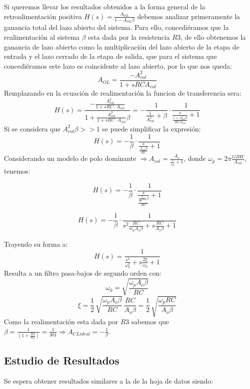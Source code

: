Si queremos llevar los resultados obtenidos a la forma general de la retroalimentación positiva $H(s) = \frac{A_{OL}}{1-A_{OL}\beta}$ debemos analizar primeramente la ganancia total del lazo abierto del sistema. Para ello, concediéramos que la realimentación al sistema $\beta$ esta dada por la resistencia $R3$, de ello obtenemos la ganancia de lazo abierto como la multiplicación del lazo abierto de la etapa de entrada y el lazo cerrado de la etapa de salida, que para el sistema que concediéramos este lazo es coincidente al lazo abierto, por lo que nos queda:
$$A_{OL} = \frac{-A_{vol}^2}{1 + sRCA_{vol}}$$
Remplazando en la ecuación de realimentación la funcion de transferencia sera:
$$H(s)=\frac{-\frac{A_{vol}^2}{1+sRC\cdot A_{vol}}}{1+\frac{A_{vol}^2}{1+sRC\cdot A_{vol}}\beta}
	=-\frac{1}{\frac{1}{A_{vol}^2}+\beta}\cdot \frac{1}{\frac{s}{\frac{1+A_{vol}^2\beta}{RCA_{vol}}} +1}$$
Si se considera que $A_{vol}^2\beta >> 1$ se puede simplificar la expresi\'on:
	\[H(s) = -\frac{1}{\beta}\cdot \frac{1}{\frac{s}{\frac{A_{vol}\beta}{RC}}+1}\]
Considerando un modelo de polo dominante $\Longrightarrow A_{vol} = \frac{A_o}{\frac{s}{\omega_p}+1}$, donde $\omega_p = 2\pi \frac{GBW}{A_{vol}}$, tenemos:

    $$H(s) = -\frac{1}{\beta} \cdot \frac{1}{\frac{s}{\frac{\frac{A_o}{\frac{s}{\omega _p}+1}\beta}{RC}}+1}$$

$$H(s) = -\frac{1}{\beta} \cdot \frac{1}{s^2\frac{RC}{w_pA_o\beta}+s\frac{RC}{A_o\beta}+1}$$

Trayendo su forma a:
\begin{equation}
H(s) = \frac{1}{\frac{s^2}{\omega_0^2}+s\frac{2\xi}{\omega_0}+1}
\label{ej2FT}
\end{equation}
Resulta a un filtro pasa-bajos de segundo orden con:
$$\omega _0 = \sqrt{\frac{\omega_pA_o\beta}{RC}}$$
$$\xi=\frac{1}{2}\,\sqrt{\frac{\omega_pA_o\beta}{RC}}\,\frac{RC}{A_o\beta}=\frac{1}{2}\,\sqrt{\frac{\omega_pRC}{A_o\beta}}$$
Como la realimentación esta dada por $R3$ sabemos que $\beta = \frac{1}{\left(1 + \frac{R3}{R2}\right)} = \frac{1}{301} \Longrightarrow A_{CLideal} = -\frac{1}{\beta}$.

\subsection{Estudio de Resultados}

Se espera obtener resultados similares a la de la hoja de datos siendo:

